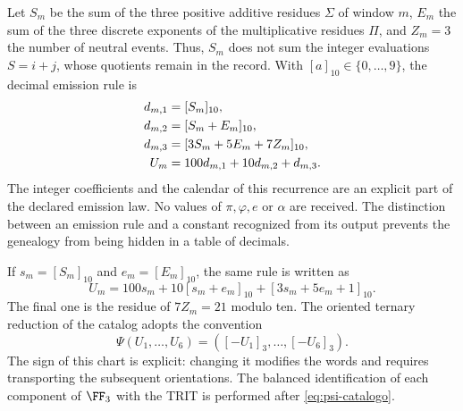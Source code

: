 Let \(S_m\) be the sum of the three positive additive residues \(\Sigma\) of window \(m\), \(E_m\) the sum of the three discrete exponents of the multiplicative residues \(\Pi\), and \(Z_m=3\) the number of neutral events. Thus, \(S_m\) does not sum the integer evaluations \(S=i+j\), whose quotients remain in the record. With \([a]_{10}\in\{0,\ldots,9\}\), the decimal emission rule is
\begin{align}
 d_{m,1}&=[S_m]_{10},\notag\\
 d_{m,2}&=[S_m+E_m]_{10},\notag\\
 d_{m,3}&=[3S_m+5E_m+7Z_m]_{10},\notag\\
 U_m&=100d_{m,1}+10d_{m,2}+d_{m,3}.
 \label{eq:emisor-seis}
\end{align}
The integer coefficients and the calendar of this recurrence are an explicit part of the declared emission law. No values of \(\pi,\varphi,e\) or \(\alpha\) are received. The distinction between an emission rule and a constant recognized from its output prevents the genealogy from being hidden in a table of decimals.

If \(s_m=[S_m]_{10}\) and \(e_m=[E_m]_{10}\), the same rule is written as
\begin{equation}
 U_m=100s_m+10[s_m+e_m]_{10}+[3s_m+5e_m+1]_{10}.
 \label{eq:acoplamiento}
\end{equation}
The final one is the residue of \(7Z_m=21\) modulo ten. The oriented ternary reduction of the catalog adopts the convention
\begin{equation}
 \Psi(U_1,\ldots,U_6)=([-U_1]_3,\ldots,[-U_6]_3).
 \label{eq:psi-catalogo}
\end{equation}
The sign of this chart is explicit: changing it modifies the words and requires transporting the subsequent orientations. The balanced identification of each component of \(\FF_3\) with the TRIT is performed after \eqref{eq:psi-catalogo}.

